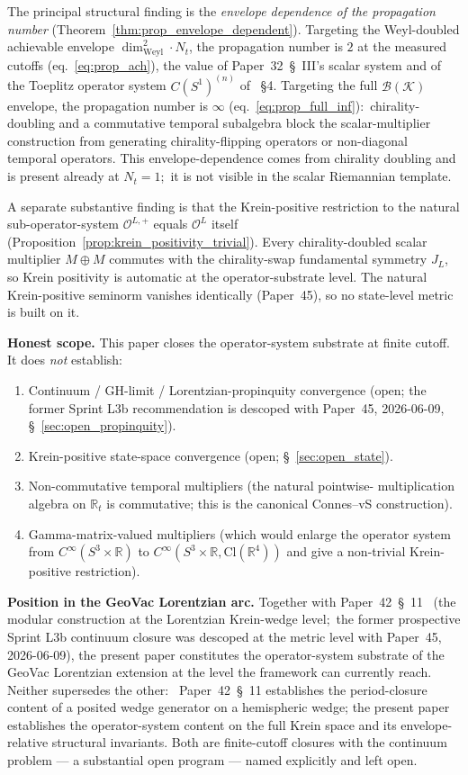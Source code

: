 \documentclass[11pt,a4paper]{article}
\theoremstyle{plain}
\theoremstyle{definition}
\newcommand{\Nt}{N_t}
\newcommand{\sthree}{S^{3}}
\newcommand{\Krein}{\mathcal{K}}
\newcommand{\Op}{\mathcal{O}}
\newcommand{\Bcal}{\mathcal{B}}
\newcommand{\R}{\mathbb{R}}
\newcommand{\JL}{J_L}
\newcommand{\Cl}{\mathrm{Cl}}
\newcommand{\Weyl}{\mathrm{Weyl}}
\begin{document}
The principal structural finding is the
\emph{envelope dependence of the propagation number}
(Theorem~\ref{thm:prop_envelope_dependent}). Targeting the
Weyl-doubled achievable envelope $\dim_\Weyl^2 \cdot \Nt$, the
propagation number is $2$ at the measured cutoffs
(eq.~\eqref{eq:prop_ach}), the value of Paper~32~\S~III's scalar
system and of the Toeplitz operator system $C(S^1)^{(n)}$ of
\cite{connes_vs2021}~\S 4. Targeting the full
$\Bcal(\Krein)$ envelope, the propagation number is $\infty$
(eq.~\eqref{eq:prop_full_inf}):\ chirality-doubling and a
commutative temporal subalgebra block the scalar-multiplier
construction from generating chirality-flipping operators or
non-diagonal temporal operators. This envelope-dependence comes from
chirality doubling and is present already at $\Nt = 1$;\ it is not
visible in the scalar Riemannian template.

A separate substantive finding is that the Krein-positive restriction
to the natural sub-operator-system $\Op^{L, +}$ equals $\Op^L$
itself (Proposition~\ref{prop:krein_positivity_trivial}). Every
chirality-doubled scalar multiplier $M \oplus M$ commutes with the
chirality-swap fundamental symmetry $\JL$, so Krein positivity is
automatic at the operator-substrate level. The natural Krein-positive
seminorm vanishes identically (Paper~45), so no state-level metric
is built on it.

\medskip\noindent
\textbf{Honest scope.} This paper closes the operator-system
substrate at finite cutoff. It does \emph{not} establish:
\begin{enumerate}\setlength{\itemsep}{2pt}
\item Continuum / GH-limit / Lorentzian-propinquity convergence
(open; the former Sprint L3b recommendation is descoped with
Paper~45, 2026-06-09, \S~\ref{sec:open_propinquity}).
\item Krein-positive state-space convergence
(open; \S~\ref{sec:open_state}).
\item Non-commutative temporal multipliers (the natural pointwise-%
multiplication algebra on $\R_t$ is commutative; this is the
canonical Connes--vS construction).
\item Gamma-matrix-valued multipliers (which would enlarge the
operator system from $C^\infty(\sthree \times \R)$ to
$C^\infty(\sthree \times \R, \Cl(\R^4))$ and give a non-trivial
Krein-positive restriction).
\end{enumerate}

\medskip\noindent
\textbf{Position in the GeoVac Lorentzian arc.} Together with
Paper~42~\S~11~\cite{paper42} (the modular construction at the Lorentzian
Krein-wedge level;\ the former prospective Sprint L3b continuum
closure was descoped at the metric level with Paper~45, 2026-06-09),
the present paper constitutes the operator-system
substrate of the GeoVac Lorentzian extension at the level the
framework can currently reach. Neither supersedes the other:
\ Paper~42~\S~11 establishes the
period-closure content of a posited wedge generator on a hemispheric
wedge; the present
paper establishes the operator-system content on the full Krein
space and its envelope-relative structural invariants. Both are
finite-cutoff closures with the continuum problem --- a substantial
open program --- named explicitly and left open.
\end{document}
